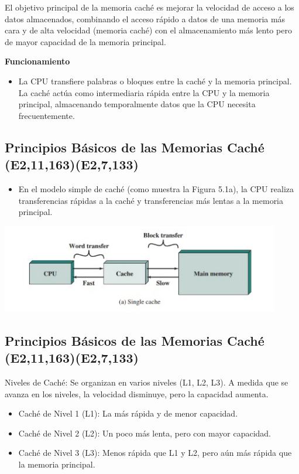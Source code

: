 \documentclass[presentation]{beamer}
\begin{document}
El objetivo principal de la memoria caché es mejorar la velocidad de acceso a los datos almacenados, combinando el acceso rápido a datos de una memoria más cara y de alta velocidad (memoria caché) con el almacenamiento más lento pero de mayor capacidad de la memoria principal.


\textbf{\textbf{\textbf{Funcionamiento}}}


\begin{itemize}
\item La CPU transfiere palabras o bloques entre la caché y la memoria principal. La caché actúa como intermediaria rápida entre la CPU y la memoria principal, almacenando temporalmente datos que la CPU necesita frecuentemente.
\end{itemize}


\subsection{Principios Básicos de las Memorias Caché (E2,11,163)(E2,7,133)}
\label{sec:org73bf613}

\begin{itemize}
\item En el modelo simple de caché (como muestra la Figura 5.1a), la CPU realiza transferencias rápidas a la caché y transferencias más lentas a la memoria principal.
\end{itemize}

\begin{center}
\includegraphics[width=.9\linewidth]{./Imagenes/captura1.png}
\end{center}

\subsection{Principios Básicos de las Memorias Caché (E2,11,163)(E2,7,133)}
\label{sec:org644d7aa}

Niveles de Caché: Se organizan en varios niveles (L1, L2, L3). A medida que se avanza en los niveles, la velocidad disminuye, pero la capacidad aumenta.

\begin{itemize}
\item Caché de Nivel 1 (L1): La más rápida y de menor capacidad.
\item Caché de Nivel 2 (L2): Un poco más lenta, pero con mayor capacidad.
\item Caché de Nivel 3 (L3): Menos rápida que L1 y L2, pero aún más rápida que la memoria principal.
\end{itemize}
\end{document}
